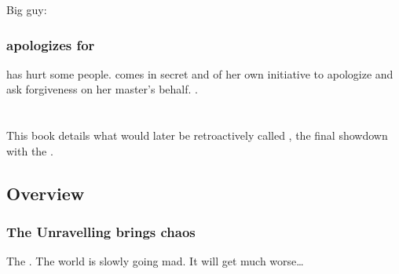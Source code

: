 Big guy: 









\subsection{\Criseis{} apologizes for \Ishnaruchaefir}
\Ishnaruchaefir{} has hurt some people. 
\Criseis{} comes in secret and of her own initiative to apologize and ask forgiveness on her master's behalf. 
. 















\chapter{\ThirdBanewarBook}
This book details what would later be retroactively called \thirdbanewar, the final showdown with the \banes. 















\section{Overview}









\subsection{The Unravelling brings chaos}
The . 
The world is slowly going mad. 
It will get much worse\ldots{}





